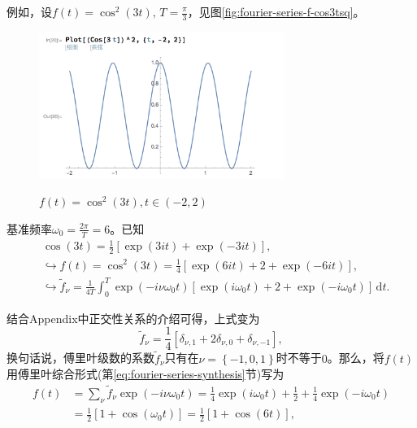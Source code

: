 例如，设$f(t) = \cos^{2} \left( 3 t \right), \, T = \frac{\pi}{3}$，见图\eqref{fig:fourier-series-f-cos3tsq}。

\begin{figure}[htbp]
   \caption{$f(t) = \cos^{2} \left( 3 t \right), t \in (-2, 2)$}
  \centering
  \includegraphics[width=8cm]{./Figures/20180305-cos3tsq.png}
  \label{fig:fourier-series-f-cos3tsq}
%
\end{figure}

基准频率$\omega_{0} = \frac{2 \pi}{T} = 6$。已知
\begin{equation}
  \label{eq:fourier-series-expo-coef}
\begin{split}
  & \cos \left( 3t \right) = \frac{1}{2} \left[
  \exp \left( 3 i t \right) + \exp \left( - 3 i t \right)
  \right], \\
  & \hookrightarrow
  f(t) = \cos^{2} (3t) = \frac{1}{4} \left[
  \exp \left( 6 i t \right) + 2 + \exp \left( - 6 i t \right)
  \right], \\
  & \hookrightarrow
  \tilde{f}_{\nu} = \frac{1}{4 T} \int_{0}^{T}
  \exp \left( -i \nu \omega_{0} t \right)
  \left[
  \exp \left( i \omega_{0} t \right) + 2
  + \exp \left( - i \omega_{0} t \right)
  \right] \, \mathrm{d} t.
\end{split}
\end{equation}

结合Appendix中正交性关系的介绍可得，上式变为
\begin{equation*}
  \tilde{f}_{\nu} = \frac{1}{4}
  \left[
  \delta_{\nu,1} + 2 \delta_{\nu,0} + \delta_{\nu,-1}
  \right],
\end{equation*}
换句话说，傅里叶级数的系数$\tilde{f}_{\nu}$只有在$\nu = \left\{ -1, 0 ,1 \right\}$时不等于$0$。那么，将$f(t)$用傅里叶综合形式(第\ref{eq:fourier-series-synthesis}节)写为
\begin{equation}
  \label{eq:fourier-series-expo-coef-cal}
  \begin{split}
    f(t) & = \sum_{\nu} \tilde{f}_{\nu} \exp \left( - i \nu \omega_{0} t \right) = \frac{1}{4} \exp \left(i \omega_{0} t \right) + \frac{1}{2} + \frac{1}{4} \exp \left( - i \omega_{0} t \right) \\
    & = \frac{1}{2} \left[ 1 + \cos \left( \omega_{0} t \right) \right] = \frac{1}{2} \left[ 1 + \cos \left( 6 t \right) \right],
  \end{split}
\end{equation}

